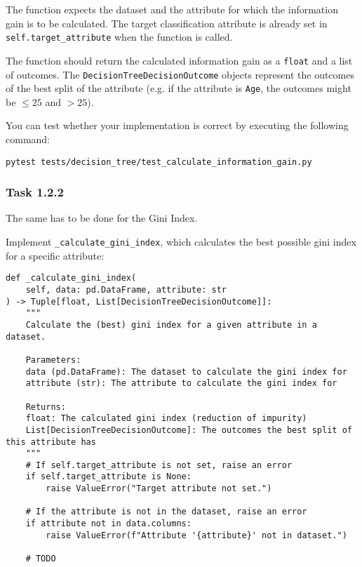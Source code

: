 \documentclass[
english,
smallborders
]{i6prcsht}
\begin{document}
\vspace*{0.1cm}

The function expects the dataset and the attribute for which the information gain is to be calculated. The target classification attribute is already set in \texttt{self.target\_attribute} when the function is called.

The function should return the calculated information gain as a \texttt{float} and a list of outcomes. The \texttt{DecisionTreeDecisionOutcome} objects represent the outcomes of the best split of the attribute (e.g. if the attribute is \texttt{Age}, the outcomes might be \texttt{$\leq 25$} and \texttt{$> 25$}).

You can test whether your implementation is correct by executing the following command:

\vspace*{0.3cm}

\begin{lstlisting}
pytest tests/decision_tree/test_calculate_information_gain.py
\end{lstlisting}

\vspace*{0.1cm}

\subsubsection*{Task 1.2.2}

The same has to be done for the Gini Index.

Implement \texttt{\_calculate\_gini\_index}, which calculates the best possible gini index for a specific attribute:

\vspace*{0.3cm}

\begin{lstlisting}
def _calculate_gini_index(
	self, data: pd.DataFrame, attribute: str
) -> Tuple[float, List[DecisionTreeDecisionOutcome]]:
	"""
	Calculate the (best) gini index for a given attribute in a dataset.

	Parameters:
	data (pd.DataFrame): The dataset to calculate the gini index for
	attribute (str): The attribute to calculate the gini index for

	Returns:
	float: The calculated gini index (reduction of impurity)
	List[DecisionTreeDecisionOutcome]: The outcomes the best split of this attribute has
	"""
	# If self.target_attribute is not set, raise an error
	if self.target_attribute is None:
		raise ValueError("Target attribute not set.")

	# If the attribute is not in the dataset, raise an error
	if attribute not in data.columns:
		raise ValueError(f"Attribute '{attribute}' not in dataset.")

	# TODO
\end{lstlisting}
\end{document}
